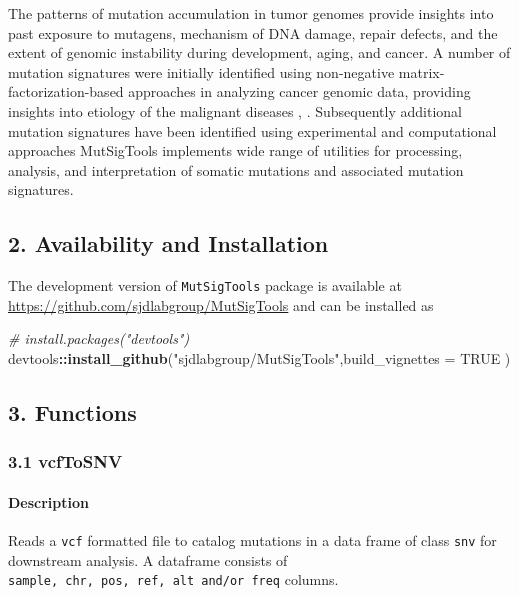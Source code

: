 \documentclass[]{article}
\newenvironment{Shaded}{\begin{snugshade}}{\end{snugshade}}
\newcommand{\KeywordTok}[1]{\textcolor[rgb]{0.13,0.29,0.53}{\textbf{#1}}}
\newcommand{\DataTypeTok}[1]{\textcolor[rgb]{0.13,0.29,0.53}{#1}}
\newcommand{\StringTok}[1]{\textcolor[rgb]{0.31,0.60,0.02}{#1}}
\newcommand{\CommentTok}[1]{\textcolor[rgb]{0.56,0.35,0.01}{\textit{#1}}}
\newcommand{\OtherTok}[1]{\textcolor[rgb]{0.56,0.35,0.01}{#1}}
\newcommand{\OperatorTok}[1]{\textcolor[rgb]{0.81,0.36,0.00}{\textbf{#1}}}
\newcommand{\NormalTok}[1]{#1}
\let\oldparagraph\paragraph
\renewcommand{\paragraph}[1]{\oldparagraph{#1}\mbox{}}
\begin{document}
The patterns of mutation accumulation in tumor genomes provide insights
into past exposure to mutagens, mechanism of DNA damage, repair defects,
and the extent of genomic instability during development, aging, and
cancer. A number of mutation signatures were initially identified using
non-negative matrix-factorization-based approaches in analyzing cancer
genomic data, providing insights into etiology of the malignant diseases
\citet{alexandrov2013signatures}, \citet{alexandrov2014mutational}.
Subsequently additional mutation signatures have been identified using
experimental and computational approaches \citet{boot2018depth}
MutSigTools implements wide range of utilities for processing, analysis,
and interpretation of somatic mutations and associated mutation
signatures.

\subsection{2. Availability and
Installation}\label{availability-and-installation}

The development version of \texttt{MutSigTools} package is available at
\url{https://github.com/sjdlabgroup/MutSigTools} and can be installed as

\begin{Shaded}
\begin{Highlighting}[]
\CommentTok{# install.packages("devtools")}
\NormalTok{devtools}\OperatorTok{::}\KeywordTok{install_github}\NormalTok{(}\StringTok{"sjdlabgroup/MutSigTools"}\NormalTok{,}\DataTypeTok{build_vignettes =} \OtherTok{TRUE}\NormalTok{ )}
\end{Highlighting}
\end{Shaded}

\subsection{3. Functions}\label{functions}

\hypertarget{vcfToSNV}{\subsubsection{3.1 vcfToSNV}\label{vcfToSNV}}

\paragraph{\texorpdfstring{\textbf{Description}}{Description}}\label{description}

Reads a \texttt{vcf} formatted file to catalog mutations in a data frame
of class \texttt{snv} for downstream analysis. A  dataframe consists of
\texttt{sample,\ chr,\ pos,\ ref,\ alt\ and/or\ freq} columns.
\end{document}
